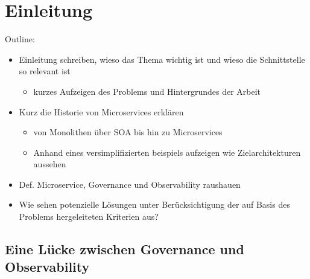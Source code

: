 \documentclass[
	12pt,
	BCOR=5mm,
	DIV=12,
	headinclude=on,
	footinclude=off,
	parskip=half,
	bibliography=totoc,
	listof=entryprefix,
	toc=listof,
	numbers=noenddot,
	plainfootsepline
]{scrreprt}
\begin{document}



\normalfont



\tableofcontents

\listoffigures




\clearpage
\ihead{\chaptername~\thechapter}
\ohead{\headmark}


\chapter{Einleitung}
Outline:
\begin{itemize}
	\item Einleitung schreiben, wieso das Thema wichtig ist und wieso die Schnittstelle so relevant ist
	\begin{itemize}
		\item kurzes Aufzeigen des Problems und Hintergrundes der Arbeit
	\end{itemize}
	\item Kurz die Historie von Microservices erklären
	\begin{itemize}
		\item von Monolithen über SOA bis hin zu Microservices
		\item Anhand eines versimplifizierten beispiels aufzeigen wie Zielarchitekturen aussehen
	\end{itemize}
	\item Def. Microservice, Governance und Observability raushauen
	\item Wie sehen potenzielle Lösungen unter Berücksichtigung der auf Basis des Problems hergeleiteten Kriterien aus?
\end{itemize}



\section{Eine Lücke zwischen Governance und Observability}
\end{document}

